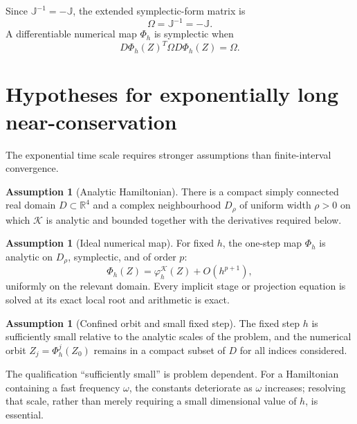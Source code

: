 \documentclass[11pt,a4paper]{article}
\theoremstyle{definition}
\newtheorem{assumption}[theorem]{Assumption}
\theoremstyle{remark}
\newcommand{\R}{\mathbb{R}}
\newcommand{\J}{\mathbb{J}}
\newcommand{\Om}{\Omega}
\newcommand{\K}{\mathcal{K}}
\newcommand{\PhiNum}{\Phi_h}
\newcommand{\flow}[1]{\varphi^{#1}}
\begin{document}
Since $\J^{-1}=-\J$, the extended symplectic-form matrix is
\begin{equation}
 \Om=\J^{-1}=-\J.
 \label{eq:extended-symplectic-form}
\end{equation}
A differentiable numerical map $\PhiNum$ is symplectic when
\begin{equation}
 D\PhiNum(Z)^T\Om D\PhiNum(Z)=\Om.
 \label{eq:symplectic-map-definition}
\end{equation}

\section{Hypotheses for exponentially long near-conservation}

The exponential time scale requires stronger assumptions than finite-interval
convergence.

\begin{assumption}[Analytic Hamiltonian]
\label{ass:analyticity}
There is a compact simply connected real domain $D\subset\R^4$ and a complex
neighbourhood $D_\rho$ of uniform width $\rho>0$ on which $\K$ is analytic
and bounded together with the derivatives required below.
\end{assumption}

\begin{assumption}[Ideal numerical map]
\label{ass:ideal-map}
For fixed $h$, the one-step map $\PhiNum$ is analytic on $D_\rho$, symplectic,
and of order $p$:
\begin{equation}
 \PhiNum(Z)=\flow{\K}_h(Z)+O(h^{p+1}),
 \label{eq:method-order}
\end{equation}
uniformly on the relevant domain.  Every implicit stage or projection equation
is solved at its exact local root and arithmetic is exact.
\end{assumption}

\begin{assumption}[Confined orbit and small fixed step]
\label{ass:confined-orbit}
The fixed step $h$ is sufficiently small relative to the analytic scales of
the problem, and the numerical orbit $Z_j=\PhiNum^j(Z_0)$ remains in a compact
subset of $D$ for all indices considered.
\end{assumption}

The qualification ``sufficiently small'' is problem dependent.  For a
Hamiltonian containing a fast frequency $\omega$, the constants deteriorate
as $\omega$ increases; resolving that scale, rather than merely requiring a
small dimensional value of $h$, is essential.
\end{document}
